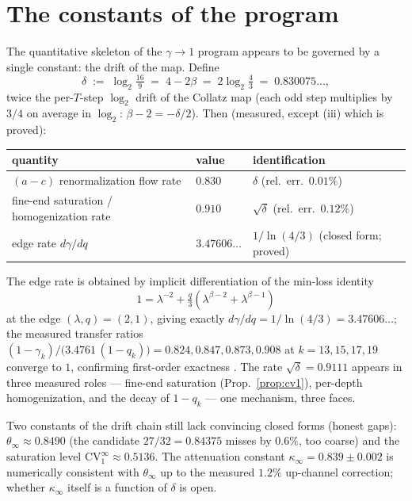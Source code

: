 \documentclass[11pt]{article}
\theoremstyle{definition}
\theoremstyle{remark}
\newcommand{\CV}{\mathrm{CV}}
\newcommand{\lam}{\lambda}
\newcommand{\gam}{\gamma}
\newcommand{\bet}{\beta}
\newcommand{\kap}{\kappa}
\begin{document}
\appendix

\section{The constants of the program}
\label{app:constants}

The quantitative skeleton of the $\gam \to 1$ program appears to be
governed by a single constant: the drift of the map. Define
\begin{equation}
\delta \;:=\; \log_2 \tfrac{16}{9}
\;=\; 4 - 2\bet
\;=\; 2 \log_2 \tfrac43
\;=\; 0.830075\ldots,
\end{equation}
twice the per-$T$-step $\log_2$ drift of the Collatz map (each odd step
multiplies by $3/4$ on average in $\log_2$: $\bet - 2 = -\delta/2$).
Then (measured, except (iii) which is proved):

\begin{center}
\begin{tabular}{l l l}
\hline
quantity & value & identification \\
\hline
$(a - c)$ renormalization flow rate & $0.830$ & $\delta$ \quad
(rel.\ err.\ $0.01\%$) \\
fine-end saturation / homogenization rate & $0.910$ & $\sqrt{\delta}$
\quad (rel.\ err.\ $0.12\%$) \\
edge rate $d\gam/dq$ & $3.47606\ldots$ & $1/\ln(4/3)$ \quad
(closed form; proved) \\
\hline
\end{tabular}
\end{center}

The edge rate is obtained by implicit differentiation of the min-loss
identity
\[
1 = \lam^{-2} + \tfrac{q}{3}\left( \lam^{\bet-2} + \lam^{\bet-1} \right)
\]
at the edge $(\lam, q) = (2, 1)$, giving exactly
$d\gam/dq = 1/\ln(4/3) = 3.47606\ldots$; the measured transfer ratios
$(1-\gam_k) / \bigl(3.4761\,(1-q_k)\bigr) = 0.824, 0.847, 0.873, 0.908$ at
$k = 13, 15, 17, 19$ converge to $1$, confirming first-order exactness
\cite{Temp26}. The rate $\sqrt{\delta} = 0.9111$ appears in three
measured roles --- fine-end saturation (Prop.~\ref{prop:cv1}), per-depth
homogenization, and the decay of $1 - q_k$ --- one mechanism, three faces.

Two constants of the drift chain still lack convincing closed forms
(honest gaps): $\theta_\infty \approx 0.8490$ (the candidate $27/32 =
0.84375$ misses by $0.6\%$, too coarse) and the saturation level
$\CV_1^\infty \approx 0.5136$. The attenuation constant
$\kap_\infty = 0.839 \pm 0.002$ is numerically consistent with
$\theta_\infty$ up to the measured $1.2\%$ up-channel correction; whether
$\kap_\infty$ itself is a function of $\delta$ is open.
\end{document}
